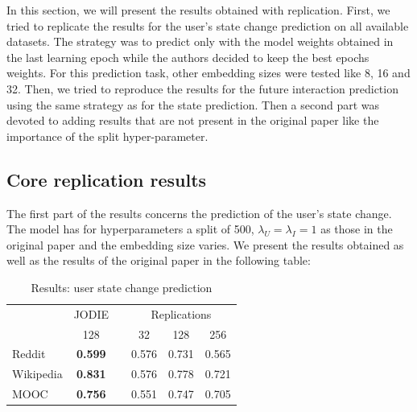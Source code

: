 In this section, we will present the results obtained with replication. First, we tried to replicate the results for the user's state change prediction on all available datasets. The strategy  was to predict only with the model weights obtained in the last learning epoch while the authors decided to keep the best epochs weights. For this prediction task, other embedding sizes were tested like 8, 16 and 32. Then, we tried to reproduce the results for the future interaction prediction using the same strategy as for the state prediction. Then a second part was devoted to adding results that are not present in the original paper like the importance of the split hyper-parameter.

\subsection*{Core replication results}
The first part of the results concerns the prediction of the user's state change. The model has for hyperparameters a split of 500, $\lambda_U = \lambda_I = 1$ as those in the original paper and the embedding size varies. We present the results obtained as well as the results of the original paper in the following table:

\begin{table}[H]
    \centering
    \begin{tabular}{@{}lcrrrr@{}}
    \toprule
    & JODIE & \phantom{abc} & \multicolumn{3}{c}{Replications} \\
    \cmidrule{2-2} \cmidrule{4-6}
    & 128 && \multicolumn{1}{c}{32} & \multicolumn{1}{c}{128} & \multicolumn{1}{c}{256} \\
    \midrule
    Reddit & \textbf{0.599} && 0.576 & 0.731 & 0.565\\
    Wikipedia &\textbf{0.831} && 0.576 & 0.778 & 0.721\\
    MOOC &\textbf{0.756} && 0.551 & 0.747 & 0.705\\
    \bottomrule
    \end{tabular}
    \caption{Results: user state change prediction}
\end{table}

